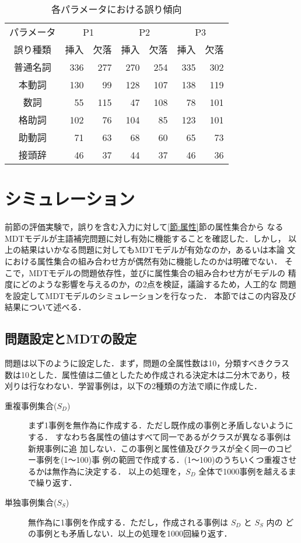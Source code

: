 \begin{table}
\begin{center}
\caption{各パラメータにおける誤り傾向}
\label{table:recogerror}
\begin{tabular}{c|rr|rr|rr}
\hline\hline
パラメータ & \multicolumn{2}{c|}{P1} 
           & \multicolumn{2}{c|}{P2} 
           & \multicolumn{2}{c}{P3} \\
誤り種類   & 挿入 & 欠落 & 挿入 & 欠落 & 挿入 & 欠落 \\
\hline
普通名詞   &  336 &  277 &  270 &  254 &  335 &  302 \\
本動詞     &  130 &   99 &  128 &  107 &  138 &  119 \\
数詞       &   55 &  115 &   47 &  108 &   78 &  101 \\
\hline
格助詞     &  102 &   76 &  104 &   85 &  123 &  101 \\
助動詞     &   71 &   63 &   68 &   60 &   65 &   73 \\
接頭辞     &   46 &   37 &   44 &   37 &   46 &   36 \\
\hline
\end{tabular}
\end{center}
\end{table}


\section{シミュレーション}

前節の評価実験で，誤りを含む入力に対して\ref{節:属性}節の属性集合から
なるMDTモデルが主語補完問題に対し有効に機能することを確認した．しかし，
以上の結果はいかなる問題に対してもMDTモデルが有効なのか，あるいは本論
文における属性集合の組み合わせ方が偶然有効に機能したのかは明確でない．
そこで，MDTモデルの問題依存性，並びに属性集合の組み合わせ方がモデルの
精度にどのような影響を与えるのか，の2点を検証，議論するため，人工的な
問題を設定してMDTモデルのシミュレーションを行なった\cite{ICSLP2000}．
本節ではこの内容及び結果について述べる．


\subsection{問題設定とMDTの設定}

問題は以下のように設定した．まず，問題の全属性数は10，分類すべきクラス
数は10とした．属性値は二値としたため作成される決定木は二分木であり，枝
刈りは行なわない．学習事例は，以下の2種類の方法で順に作成した．

\begin{description}
\item[重複事例集合($S_D$)]
まず1事例を無作為に作成する．ただし既作成の事例と矛盾しないようにする．
すなわち各属性の値はすべて同一であるがクラスが異なる事例は新規事例に追
加しない．この事例と属性値及びクラスが全く同一のコピー事例を(1〜100)事
例の範囲で作成する．(1〜100)のうちいくつ重複させるかは無作為に決定する．
以上の処理を，$S_D$ 全体で1000事例を越えるまで繰り返す．

\item[単独事例集合($S_S$)]
無作為に1事例を作成する．ただし，作成される事例は $S_D$ と $S_S$ 内の
どの事例とも矛盾しない．以上の処理を1000回繰り返す．
\end{description}

